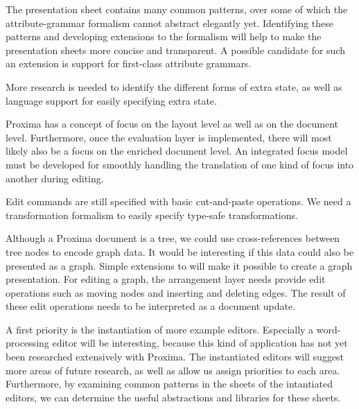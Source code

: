  The presentation sheet contains many common patterns, over some of which the attribute-grammar formalism cannot abstract elegantly yet. Identifying these patterns and developing extensions to the formalism will help  to make the presentation sheets more concise and transparent. A possible candidate for such an extension is support for first-class attribute grammars.

 More research is needed to identify the different forms of extra state, as well as language support for easily specifying extra state.

 Proxima has a concept of focus on the layout level as well as on the document level. Furthermore, once the evaluation layer is implemented, there will most likely also be a focus on the enriched document level. An integrated focus model must be developed for smoothly handling the translation of one kind of focus into another during editing.

 Edit commands are still specified with basic cut-and-paste operations. We need a transformation formalism to easily specify type-safe transformations.

 Although a Proxima document is a tree, we could use cross-references between tree nodes to encode graph data. It would be interesting if this data could also be presented as a graph. Simple extensions to {\Xprez} will make it possible to create a graph presentation. For editing a graph, the arrangement layer needs provide edit operations such as moving nodes and inserting and deleting edges. The result of these edit operations needs to be interpreted as a document update.

\bigskip
A first priority is the instantiation of more example editors. Especially a word-processing editor will be interesting, because this kind of application has not yet been researched extensively with Proxima. The instantiated editors will suggest more areas of future research, as well as allow us assign priorities to each area. Furthermore, by examining common patterns in the sheets of the intantiated editors, we can determine the useful abstractions and libraries for these sheets.